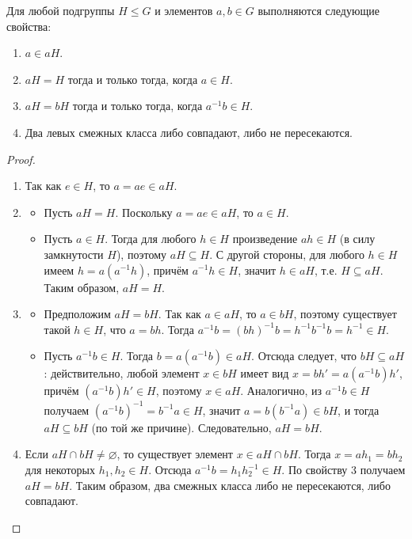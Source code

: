 \documentclass[10pt]{article}
\begin{document}
\begin{stat}
Для любой подгруппы $H \le G$ и элементов $a, b \in G$ выполняются следующие свойства:
\begin{enumerate}
    \item $a \in aH$.
    \item $aH = H$ тогда и только тогда, когда $a \in H$.
    \item $aH = bH$ тогда и только тогда, когда $a^{-1}b \in H$.
    \item Два левых смежных класса либо совпадают, либо не пересекаются.
\end{enumerate}
\end{stat}
\begin{proof}
\begin{enumerate}
    \item Так как $e \in H$, то $a = a e \in aH$.
    \item 
        \begin{itemize}
            \item[($\Rightarrow$)] Пусть $aH = H$. Поскольку $a = a e \in aH$, то $a \in H$.
            \item[($\Leftarrow$)] Пусть $a \in H$. Тогда для любого $h \in H$ произведение $ah \in H$ (в силу замкнутости $H$), поэтому $aH \subseteq H$. С другой стороны, для любого $h \in H$ имеем $h = a(a^{-1}h)$, причём $a^{-1}h \in H$, значит $h \in aH$, т.е. $H \subseteq aH$. Таким образом, $aH = H$.
        \end{itemize}
    \item 
        \begin{itemize}
            \item[($\Rightarrow$)] Предположим $aH = bH$. Так как $a \in aH$, то $a \in bH$, поэтому существует такой $h \in H$, что $a = b h$. Тогда $a^{-1}b = (b h)^{-1}b = h^{-1} b^{-1} b = h^{-1} \in H$.
            \item[($\Leftarrow$)] Пусть $a^{-1}b \in H$. Тогда $b = a (a^{-1}b) \in aH$. Отсюда следует, что $bH \subseteq aH$: действительно, любой элемент $x \in bH$ имеет вид $x = b h' = a (a^{-1}b) h'$, причём $(a^{-1}b) h' \in H$, поэтому $x \in aH$. Аналогично, из $a^{-1}b \in H$ получаем $(a^{-1}b)^{-1} = b^{-1}a \in H$, значит $a = b (b^{-1}a) \in bH$, и тогда $aH \subseteq bH$ (по той же причине). Следовательно, $aH = bH$.
        \end{itemize}
    \item Если $aH \cap bH \neq \varnothing$, то существует элемент $x \in aH \cap bH$. Тогда $x = a h_1 = b h_2$ для некоторых $h_1, h_2 \in H$. Отсюда $a^{-1}b = h_1 h_2^{-1} \in H$. По свойству 3 получаем $aH = bH$. Таким образом, два смежных класса либо не пересекаются, либо совпадают.
\end{enumerate}
\end{proof}
\end{document}
